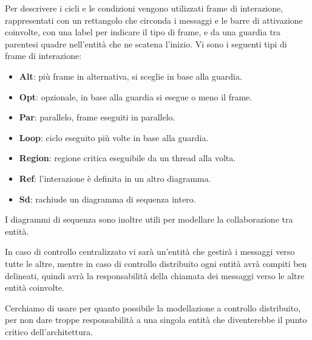         Per descrivere i cicli e le condizioni vengono utilizzati frame di interazione, rappresentati con un rettangolo che circonda i messaggi e le barre di attivazione coinvolte, con una label per indicare il tipo di frame, e da una guardia tra parentesi quadre nell'entità che ne scatena l'inizio.
        Vi sono i seguenti tipi di frame di interazione:
        \begin{itemize}
            \item \textbf{Alt}: più frame in alternativa, si sceglie in base alla guardia.
            \item \textbf{Opt}: opzionale, in base alla guardia si esegue o meno il frame.
            \item \textbf{Par}: parallelo, frame eseguiti in parallelo.
            \item \textbf{Loop}: ciclo eseguito più volte in base alla guardia.
            \item \textbf{Region}: regione critica eseguibile da un thread alla volta.
            \item \textbf{Ref}: l'interazione è definita in un altro diagramma.
            \item \textbf{Sd}: rachiude un diagramma di sequenza intero.
        \end{itemize}
        I diagrammi di sequenza sono inoltre utili per modellare la collaborazione tra entità.\par
        In caso di controllo centralizzato vi sarà un'entità che gestirà i messaggi verso tutte le altre, mentre in caso di controllo distribuito ogni entità avrà compiti ben delineati, quindi avrà la responsabilità della chiamata dei messaggi verso le altre entità coinvolte.\par
        Cerchiamo di usare per quanto possibile la modellazione a controllo distribuito, per non dare troppe responsabilità a una singola entità che diventerebbe il punto critico dell'architettura.




